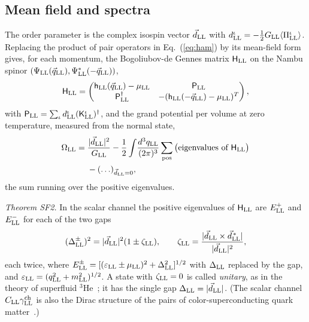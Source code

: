 \subsection{Mean field and spectra}

The order parameter is the complex isospin vector $\vec d_{\rm LL}$ with $d^\iota_{\rm
LL}=-\tfrac12G_{\rm LL}\langle\Pi^\iota_{\rm LL}\rangle$. Replacing the product of pair operators in
Eq.~(\ref{eq:ham}) by its mean-field form gives, for each momentum, the Bogoliubov-de Gennes matrix
$\mathsf H_{\rm LL}$ on the Nambu spinor $(\Psi_{\rm LL}(\vec q_{\rm LL}),\Psi^*_{\rm LL}(-\vec q_{\rm LL}))$,
\begin{equation}
\mathsf H_{\rm LL}=\begin{pmatrix}\mathsf h_{\rm LL}(\vec q_{\rm LL})-\mu_{\rm LL}&\mathsf P_{\rm LL}\\\mathsf P_{\rm LL}^\dagger&-(\mathsf h_{\rm LL}(-\vec q_{\rm LL})-\mu_{\rm LL})^T\end{pmatrix},
\label{eq:bdg}
\end{equation}
with $\mathsf P_{\rm LL}=\sum_\iota d^\iota_{\rm LL}(\mathsf K^\iota_{\rm LL})^\dagger$, and the grand potential
per volume at zero temperature, measured from the normal state,
\begin{align}
\Omega_{\rm LL}={}&\frac{\lvert\vec d_{\rm LL}\rvert^2}{G_{\rm LL}}-\frac12\int\!\frac{d^3q_{\rm LL}}{(2\pi)^3}\sum_{\rm pos}\big(\text{eigenvalues of }\mathsf H_{\rm LL}\big)\nonumber\\
&-(\ldots)_{\vec d_{\rm LL}=0},
\label{eq:omega}
\end{align}
the sum running over the positive eigenvalues.

\noindent\emph{Theorem SF2.} In the scalar channel the positive eigenvalues of $\mathsf H_{\rm LL}$ are
$E^+_{\rm LL}$ and $E^-_{\rm LL}$ for each of the two gaps
\begin{equation}
(\Delta^\pm_{\rm LL})^2=\lvert\vec d_{\rm LL}\rvert^2(1\pm\zeta_{\rm LL}),\qquad \zeta_{\rm LL}=\frac{\lvert\vec d_{\rm LL}\times\vec d^{\,*}_{\rm LL}\rvert}{\lvert\vec d_{\rm LL}\rvert^2},
\label{eq:gaps}
\end{equation}
each twice, where $E^\pm_{\rm LL}=[(\varepsilon_{\rm LL}\pm\mu_{\rm LL})^2+\Delta_{\rm LL}^2]^{1/2}$ with
$\Delta_{\rm LL}$ replaced by the gap, and $\varepsilon_{\rm LL}=(q_{\rm LL}^2+m_{\rm LL}^2)^{1/2}$. A state
with $\zeta_{\rm LL}=0$ is called \emph{unitary}, as in the theory of superfluid
$^3$He~\cite{BalianWerthamer1963,Leggett1975}; it has the single gap $\Delta_{\rm LL}=\lvert\vec d_{\rm
LL}\rvert$. (The scalar channel $C_{\rm LL}\gamma^{\rm ch}_{\rm LL}$ is also the Dirac structure of the
pairs of color-superconducting quark matter~\cite{AlfordRajagopalWilczek1999}.)

